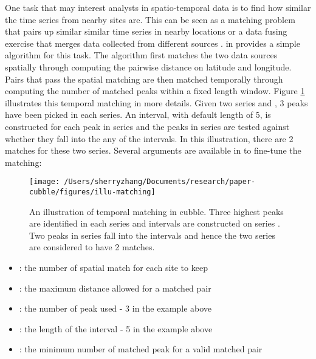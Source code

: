 \documentclass[
]{jss}
\providecommand{\tightlist}{%
  \setlength{\itemsep}{0pt}\setlength{\parskip}{0pt}}
\begin{document}
One task that may interest analysts in spatio-temporal data is to find how similar the time series from nearby sites are. This can be seen as a matching problem \citep{stuart2010matching, mcintosh2018using} that pairs up similar similar time series in nearby locations or a data fusing exercise that merges data collected from different sources \citep{cocchi2019data}.  in  provides a simple algorithm for this task. The algorithm first matches the two data sources spatially through computing the pairwise distance on latitude and longitude. Pairs that pass the spatial matching are then matched temporally through computing the number of matched peaks within a fixed length window. Figure \ref{fig:illu-matching} illustrates this temporal matching in more details. Given two series  and , 3 peaks have been picked in each series. An interval, with default length of 5, is constructed for each peak in series  and the peaks in series  are tested against whether they fall into the any of the intervals. In this illustration, there are 2 matches for these two series. Several arguments are available in  to fine-tune the matching:

\begin{CodeChunk}
\begin{figure}

{\centering \texttt{[image: /Users/sherryzhang/Documents/research/paper-cubble/figures/illu-matching]} 

}

\caption{An illustration of temporal matching in cubble. Three highest peaks are identified in each series and intervals are constructed on series . Two peaks in series  fall into the intervals and hence the two series are considered to have 2 matches.}\label{fig:illu-matching}
\end{figure}
\end{CodeChunk}

\begin{itemize}
\tightlist
\item
  : the number of spatial match for each site to keep
\item
  : the maximum distance allowed for a matched pair
\item
  : the number of peak used - 3 in the example above
\item
  : the length of the interval - 5 in the example above
\item
  : the minimum number of matched peak for a valid matched pair
\end{itemize}
\end{document}
